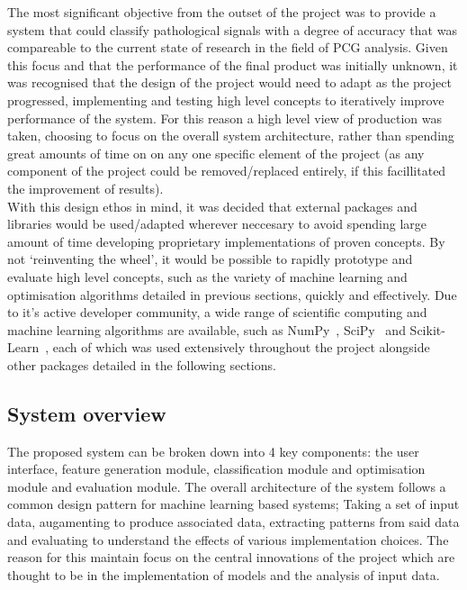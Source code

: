 \documentclass[titlepage, 12pt]{scrartcl} \usepackage{enumitem}
\begin{document}
The most significant objective from the outset of the project was to provide a
system that could classify pathological signals with a degree of accuracy that
was compareable to the current state of research in the field of PCG analysis.
Given this focus and that the performance of the final product was initially
unknown, it was recognised that the design of the project would need to adapt
as the project progressed, implementing and testing high level concepts to
iteratively improve performance of the system. For this reason a high level
view of production was taken, choosing to focus on the overall system
architecture, rather than spending great amounts of time on on any one specific
element of the project (as any component of the project could be
removed/replaced entirely, if this facillitated the improvement of results).\\

With this design ethos in mind, it was decided that external packages and
libraries would be used/adapted wherever neccesary to avoid spending large
amount of time developing proprietary implementations of proven concepts. By
not `reinventing the wheel', it would be possible to rapidly prototype and
evaluate high level concepts, such as the variety of machine learning and
optimisation algorithms detailed in previous sections, quickly and effectively.
Due to it's active developer community, a wide range of scientific computing
and machine learning algorithms are available, such as
NumPy~\parencite{VanDerWalt2011}, SciPy~\parencite{Millman2011} and
Scikit-Learn~\parencite{Pedregosa2011}, each of which was used extensively
throughout the project alongside other packages detailed in the following
sections.

\subsection{System overview}
The proposed system can be broken down into 4 key components: the user
interface, feature generation module, classification module and optimisation
module and evaluation module. The overall architecture of the system follows a
common design pattern for machine learning based systems; Taking a set of input
data, augamenting to produce associated data, extracting patterns from said
data and evaluating to understand the effects of various implementation
choices. The reason for this maintain focus on the central innovations of the
project which are thought to be in the implementation of models and the
analysis of input data.
\end{document}
